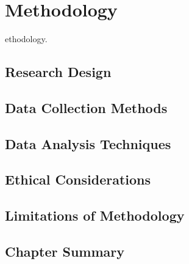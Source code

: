 \chapter{Methodology}\label{ch3}

ethodology.

\section{Research Design}

\section{Data Collection Methods}

\section{Data Analysis Techniques}

\section{Ethical Considerations}

\section{Limitations of Methodology}

\section{Chapter Summary}
